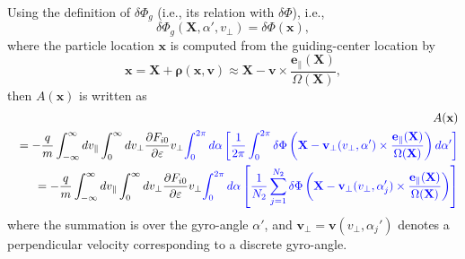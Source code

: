 \documentclass{llncs}
\newcommand{\tmcolor}[2]{{\color{#1}{#2}}}
\newcommand{\tmmathbf}[1]{\ensuremath{\boldsymbol{#1}}}
\begin{document}
\

\

\

Using the definition of $\delta \Phi_g$ (i.e., its relation with $\delta
\Phi$), i.e.,
\begin{equation}
  \delta \Phi_g (\mathbf{X}, \alpha', v_{\perp}) = \delta \Phi (\mathbf{x}),
\end{equation}
where the particle location $\tmmathbf{x}$ is computed from the guiding-center
location by
\begin{equation}
  \mathbf{x}=\mathbf{X}+\tmmathbf{\rho} (\mathbf{x}, \mathbf{v}) \approx
  \mathbf{X}-\mathbf{v} \times \frac{\mathbf{e}_{\parallel}
  (\mathbf{X})}{\Omega (\mathbf{X})},
\end{equation}
then $A (\mathbf{x})$ is written as
\begin{eqnarray*}
  &  & A (\mathbf{x})\\
  &  & = - \frac{q}{m} \int_{- \infty}^{\infty} d v_{\parallel}
  \int_0^{\infty} d v_{\perp} \frac{\partial F_{i 0}}{\partial \varepsilon}
  v_{\perp} \tmcolor{blue}{\int_0^{2 \pi} d \alpha \left[ \frac{1}{2 \pi}
  \int_0^{2 \pi} \delta \Phi \left( \mathbf{X}-\mathbf{v}_{\perp} (v_{\perp},
  \alpha') \times \frac{\mathbf{e}_{\parallel} (\mathbf{X})}{\Omega
  (\mathbf{X})} \right) d \alpha' \right]}\\
  &  & = - \frac{q}{m} \int_{- \infty}^{\infty} d v_{\parallel}
  \int_0^{\infty} d v_{\perp} \frac{\partial F_{i 0}}{\partial \varepsilon}
  v_{\perp} \tmcolor{blue}{\int_0^{2 \pi} d \alpha \left[ \frac{1}{N_2}
  \sum_{j = 1}^{N_2} \delta \Phi \left( \mathbf{X}-\mathbf{v}_{\perp}
  (v_{\perp}, \alpha'_j) \times \frac{\mathbf{e}_{\parallel}
  (\mathbf{X})}{\Omega (\mathbf{X})} \right) \right]}
\end{eqnarray*}
where the summation is over the gyro-angle $\alpha'$, and $\mathbf{v}_{\perp}
= \mathbf{v} (v_{\perp}, \alpha_j')$ denotes a perpendicular velocity
corresponding to a discrete gyro-angle.
\end{document}
